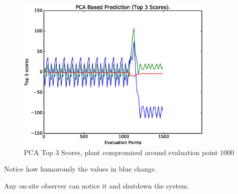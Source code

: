 \documentclass[10pt]{beamer}
\begin{document}
\begin{frame}
  \begin{figure}
    \centering
    \includegraphics[width=0.85\textwidth]{Compromised_Functioning_PCA.eps}
    \caption{\label{fig:frog}PCA Top 3 Scores, plant compromised around evaluation point 1000}
  \end{figure}
  Notice how humorously the values in blue change. 
  
  Any on-site observer can notice it and shutdown the system.
\end{frame}
\end{document}

